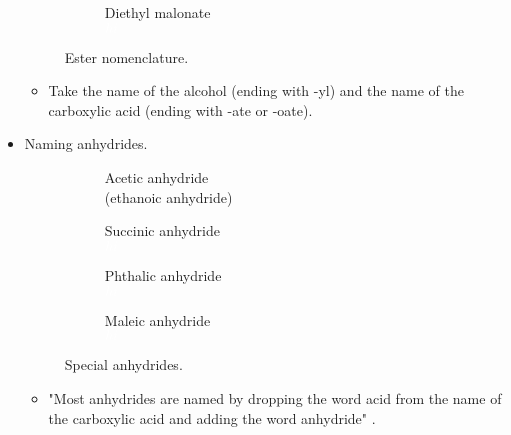 \documentclass[../notes.tex]{subfiles}
\begin{document}
\begin{itemize}
\begin{figure}[h!]
\begin{subfigure}[b]{0.3\linewidth}
            \caption*{\textcolor{rex}{Diethyl} \textcolor{blx}{malonate}\\${\color{white}hi}$}
            \label{fig:esterNomenclaturec}
        \end{subfigure}
        \caption{Ester nomenclature.}
        \label{fig:esterNomenclature}
    \end{figure}
    \begin{itemize}
        \item Take the name of the alcohol (ending with -yl) and the name of the carboxylic acid (ending with -ate or -oate).
    \end{itemize}
    \item Naming anhydrides.
    \begin{figure}[h!]
        \centering
        \footnotesize
        \captionsetup{justification=centering}
        \begin{subfigure}[b]{0.24\linewidth}
            \centering
            \caption*{Acetic anhydride\\(ethanoic anhydride)}
            \label{fig:anhydrideNomenclaturea}
        \end{subfigure}
        \begin{subfigure}[b]{0.24\linewidth}
            \centering
            \caption*{Succinic anhydride\\${\color{white}hi}$}
            \label{fig:anhydrideNomenclatureb}
        \end{subfigure}
        \begin{subfigure}[b]{0.24\linewidth}
            \centering
            \caption*{Phthalic anhydride\\${\color{white}hi}$}
            \label{fig:anhydrideNomenclaturec}
        \end{subfigure}
        \begin{subfigure}[b]{0.24\linewidth}
            \centering
            \caption*{Maleic anhydride\\${\color{white}hi}$}
            \label{fig:anhydrideNomenclatured}
        \end{subfigure}
        \caption{Special anhydrides.}
        \label{fig:anhydrideNomenclature}
    \end{figure}
    \begin{itemize}
        \item "Most anhydrides are named by dropping the word acid from the name of the carboxylic acid and adding the word anhydride" \parencite[766]{bib:SolomonsEtAl}.

\end{itemize}
\end{itemize}
\end{document}
